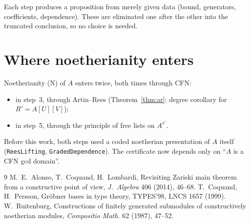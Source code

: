 \documentclass[11pt]{amsart}
\theoremstyle{definition}
\theoremstyle{remark}
\begin{document}
\medskip
Each step produces a proposition from merely given data (bound,
generators, coefficients, dependence). These are eliminated one after
the other into the truncated conclusion, so no choice is needed.

\section{Where noetherianity enters}

Noetherianity (N) of $A$ enters twice, both times through CFN:
\begin{itemize}
\item in step~3, through Artin--Rees (Theorem~\ref{thm:ar}: degree
  corollary for $R'=A[U][V]$);
\item in step~5, through the principle of free lists on $A^{s'}$.
\end{itemize}
Before this work, both steps used a coded noetherian presentation of
$A$ itself (\texttt{ReesLifting}, \texttt{GradedDependence}). The
certificate now depends only on ``$A$ is a CFN gcd domain''.

\begin{thebibliography}{9}
 M.~E.~Alonso, T.~Coquand, H.~Lombardi, Revisiting Zariski
  main theorem from a constructive point of view, \emph{J.~Algebra} 406
  (2014), 46--68.
 T.~Coquand, H.~Persson, Gröbner bases in type theory,
  TYPES'98, LNCS 1657 (1999).
 W.~Ruitenburg, Constructions of finitely generated submodules
  of constructively noetherian modules, \emph{Compositio Math.} 62 (1987),
  47--52.
\end{thebibliography}
\end{document}
